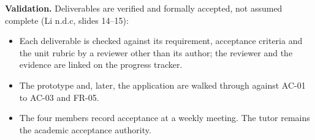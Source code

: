 \textbf{Validation.} Deliverables are verified and formally accepted, not assumed complete (Li n.d.c, slides 14–15):

\begin{itemize}
  \item Each deliverable is checked against its requirement, acceptance criteria and the unit rubric by a reviewer other than its author; the reviewer and the evidence are linked on the progress tracker.
  \item The prototype and, later, the application are walked through against AC-01 to AC-03 and FR-05.
  \item The four members record acceptance at a weekly meeting. The tutor remains the academic acceptance authority.
\end{itemize}
